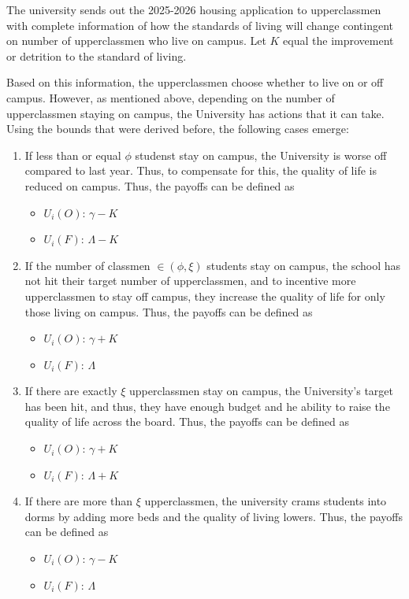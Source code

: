 \documentclass[12pt]{article}
\begin{document}
The university sends out the 2025-2026 housing application to upperclassmen with complete information of how the standards of living will change contingent on number of upperclassmen who live on campus. Let $K$ equal the improvement or detrition to the standard of living. 

Based on this information, the upperclassmen choose whether to live on or off campus.
However, as mentioned above, depending on the number of upperclassmen staying on campus, the University has actions that it can take. Using the bounds that were derived before, the following cases emerge:
\begin{enumerate}
    \item If less than or equal $\phi$ studenst stay on campus, the University is worse off compared to last year. Thus, to compensate for this, the quality of life is reduced on campus. Thus, the payoffs can be defined as \begin{itemize}
        \item $U_i(O)$: $\gamma - K$
        \item $U_i(F)$: $\Lambda - K$
    \end{itemize}
    \item If the number of classmen  $ \in (\phi,\xi)$ students stay on campus, the school has not hit their target number of upperclassmen, and to incentive more upperclassmen to stay off campus, they increase the quality of life for only those living on campus. Thus, the payoffs can be defined as \begin{itemize}
        \item $U_i(O)$: $\gamma + K$
        \item $U_i(F)$: $\Lambda$
    \end{itemize}
    \item If there are exactly $\xi$ upperclassmen stay on campus, the University's target has been hit, and thus, they have enough budget and he ability to raise the quality of life across the board. Thus, the payoffs can be defined as \begin{itemize}
        \item $U_i(O)$: $\gamma + K$
        \item $U_i(F)$: $\Lambda + K$
    \end{itemize}
    \item If there are more than $\xi$ upperclassmen, the university crams students into dorms by adding more beds and the quality of living lowers. Thus, the payoffs can be defined as \begin{itemize}
        \item $U_i(O)$: $\gamma - K$
        \item $U_i(F)$: $\Lambda$
    \end{itemize}
\end{enumerate}
\end{document}

